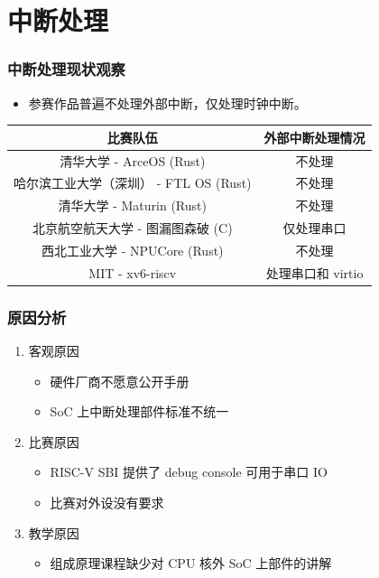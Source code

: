 \section{中断处理}

\begin{frame}
    \frametitle{中断处理现状观察}

    \begin{itemize}
        \item 参赛作品普遍不处理外部中断，仅处理时钟中断。
    \end{itemize}

    \begin{table}
        \centering
        \begin{tabular}{|c|c|}
            \hline \textbf{比赛队伍}               & \textbf{外部中断处理情况} \\
            \hline 清华大学 - ArceOS (Rust)        & 不处理               \\
            \hline 哈尔滨工业大学（深圳） - FTL OS (Rust) & 不处理               \\
            \hline 清华大学 - Maturin (Rust)       & 不处理               \\
            \hline 北京航空航天大学 - 图漏图森破 (C)        & 仅处理串口             \\
            \hline 西北工业大学 - NPUCore (Rust)     & 不处理               \\
            \hline MIT - xv6-riscv             & 处理串口和 virtio      \\
            \hline
        \end{tabular}
    \end{table}


\end{frame}

\begin{frame}
    \frametitle{原因分析}

    \begin{enumerate}
        \item 客观原因
              \begin{itemize}
                  \item 硬件厂商不愿意公开手册
                  \item SoC 上中断处理部件标准不统一
              \end{itemize}
        \item 比赛原因
              \begin{itemize}
                  \item RISC-V SBI 提供了 debug console 可用于串口 IO
                  \item 比赛对外设没有要求
              \end{itemize}
        \item 教学原因
              \begin{itemize}
                  \item 组成原理课程缺少对 CPU 核外 SoC 上部件的讲解
              \end{itemize}
    \end{enumerate}


\end{frame}


